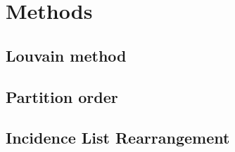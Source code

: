 \chapter{Methods}\label{\positionnumber}
    \section{Louvain method}\label{\positionnumber}
    
    \section{Partition order}\label{\positionnumber}
    
    \section{Incidence List Rearrangement}\label{\positionnumber}
